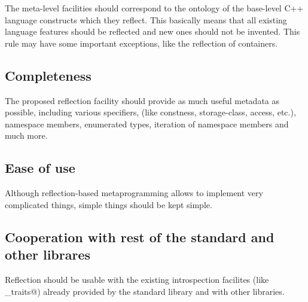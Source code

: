 The meta-level facilities should
correspond to the ontology of the base-level C++ language constructs
which they reflect. This basically means that all existing language
features should be reflected and new ones should not be invented.
This rule may have some important exceptions, like the reflection of
containers. 

\subsection{Completeness}

The proposed reflection facility should
provide as much useful metadata as possible, including various specifiers,
(like constness, storage-class, access, etc.), namespace members,
enumerated types, iteration of namespace members and much more.

\subsection{Ease of use}

Although reflection-based metaprogramming
allows to implement very complicated things, simple things
should be kept simple.

\subsection{Cooperation with rest of the standard and other librares}

Reflection should be
usable with the existing introspection facilites (like \verb@type_traits@)
already provided by the standard library and with other libraries.
